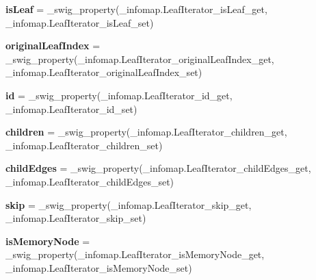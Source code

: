 \begin{DoxyCompactItemize}
{\bfseries is\+Leaf} = \+\_\+swig\+\_\+property(\+\_\+infomap.\+Leaf\+Iterator\+\_\+is\+Leaf\+\_\+get, \+\_\+infomap.\+Leaf\+Iterator\+\_\+is\+Leaf\+\_\+set)
\item 
\mbox{\label{classdsmacc_1_1graph_1_1infomap_1_1LeafIterator_aa54be6fd55e91bb216d9c1e8d224333d}} 
{\bfseries original\+Leaf\+Index} = \+\_\+swig\+\_\+property(\+\_\+infomap.\+Leaf\+Iterator\+\_\+original\+Leaf\+Index\+\_\+get, \+\_\+infomap.\+Leaf\+Iterator\+\_\+original\+Leaf\+Index\+\_\+set)
\item 
\mbox{\label{classdsmacc_1_1graph_1_1infomap_1_1LeafIterator_a157fc3f4dc797ac26b910bd46910616e}} 
{\bfseries id} = \+\_\+swig\+\_\+property(\+\_\+infomap.\+Leaf\+Iterator\+\_\+id\+\_\+get, \+\_\+infomap.\+Leaf\+Iterator\+\_\+id\+\_\+set)
\item 
\mbox{\label{classdsmacc_1_1graph_1_1infomap_1_1LeafIterator_ada43be471365b3a9a45b01ef6e5d004e}} 
{\bfseries children} = \+\_\+swig\+\_\+property(\+\_\+infomap.\+Leaf\+Iterator\+\_\+children\+\_\+get, \+\_\+infomap.\+Leaf\+Iterator\+\_\+children\+\_\+set)
\item 
\mbox{\label{classdsmacc_1_1graph_1_1infomap_1_1LeafIterator_ab1748f161fca7bba5d047edad92f301d}} 
{\bfseries child\+Edges} = \+\_\+swig\+\_\+property(\+\_\+infomap.\+Leaf\+Iterator\+\_\+child\+Edges\+\_\+get, \+\_\+infomap.\+Leaf\+Iterator\+\_\+child\+Edges\+\_\+set)
\item 
\mbox{\label{classdsmacc_1_1graph_1_1infomap_1_1LeafIterator_a20982f28d40f62feffd79c220dee722a}} 
{\bfseries skip} = \+\_\+swig\+\_\+property(\+\_\+infomap.\+Leaf\+Iterator\+\_\+skip\+\_\+get, \+\_\+infomap.\+Leaf\+Iterator\+\_\+skip\+\_\+set)
\item 
\mbox{\label{classdsmacc_1_1graph_1_1infomap_1_1LeafIterator_acf56c7ac58029bfa2157b6db61dcb4da}} 
{\bfseries is\+Memory\+Node} = \+\_\+swig\+\_\+property(\+\_\+infomap.\+Leaf\+Iterator\+\_\+is\+Memory\+Node\+\_\+get, \+\_\+infomap.\+Leaf\+Iterator\+\_\+is\+Memory\+Node\+\_\+set)
\item 

\end{DoxyCompactItemize}
